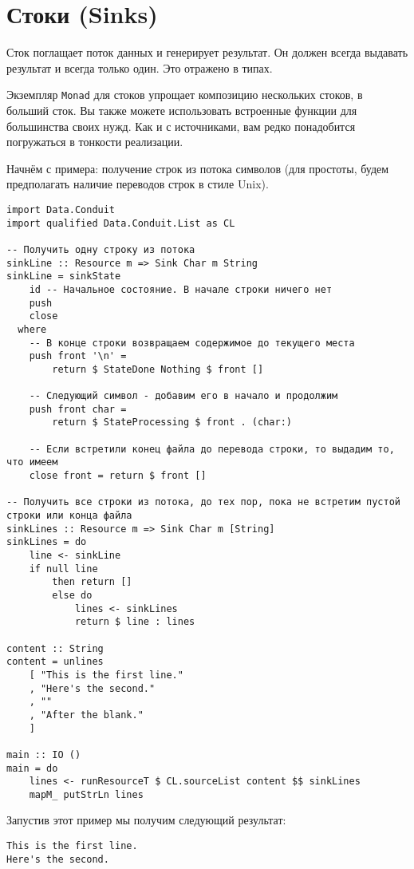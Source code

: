 \section{Стоки (Sinks)}

Сток поглащает поток данных и генерирует результат. Он должен всегда выдавать результат
и всегда только один. Это отражено в типах.

Экземпляр \lstinline=Monad= для стоков упрощает композицию нескольких стоков, в больший
сток. Вы также
можете использовать встроенные функции для большинства своих нужд. Как и с источниками,
вам редко понадобится погружаться в тонкости реализации. 

Начнём с примера:
получение строк из потока символов (для простоты, будем предполагать наличие переводов
строк в стиле Unix).

\begin{lstlisting}
import Data.Conduit
import qualified Data.Conduit.List as CL

-- Получить одну строку из потока
sinkLine :: Resource m => Sink Char m String
sinkLine = sinkState
    id -- Начальное состояние. В начале строки ничего нет
    push
    close
  where
    -- В конце строки возвращаем содержимое до текущего места
    push front '\n' =
        return $ StateDone Nothing $ front []

    -- Следующий символ - добавим его в начало и продолжим
    push front char =
        return $ StateProcessing $ front . (char:)

    -- Если встретили конец файла до перевода строки, то выдадим то, что имеем
    close front = return $ front []

-- Получить все строки из потока, до тех пор, пока не встретим пустой строки или конца файла
sinkLines :: Resource m => Sink Char m [String]
sinkLines = do
    line <- sinkLine
    if null line
        then return []
        else do
            lines <- sinkLines
            return $ line : lines

content :: String
content = unlines
    [ "This is the first line."
    , "Here's the second."
    , ""
    , "After the blank."
    ]

main :: IO ()
main = do
    lines <- runResourceT $ CL.sourceList content $$ sinkLines
    mapM_ putStrLn lines
\end{lstlisting}
Запустив этот пример мы получим следующий результат:
\begin{verbatim}
This is the first line.
Here's the second.
\end{verbatim}

